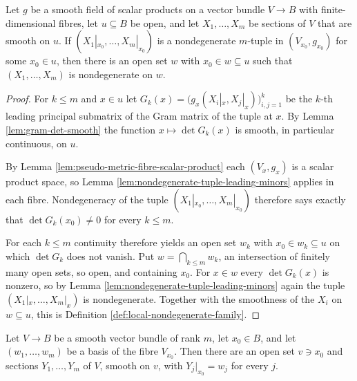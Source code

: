 \begin{lemma}
\label{lem:open-nondegenerate-tuple}
\leanok
{}
Let $g$ be a smooth field of scalar products on a vector bundle $V \to B$ with finite-dimensional fibres, let $u \subseteq B$ be open, and let $X_1,\ldots,X_m$ be sections of $V$ that are smooth on $u$. If $(X_1|_{x_0},\ldots,X_m|_{x_0})$ is a nondegenerate $m$-tuple in $(V_{x_0}, g_{x_0})$ for some $x_0 \in u$, then there is an open set $w$ with $x_0 \in w \subseteq u$ such that $(X_1,\ldots,X_m)$ is nondegenerate on $w$.
\end{lemma}

\begin{proof}
\leanok
{}
For $k \leq m$ and $x \in u$ let $G_k(x) = \bigl(g_x(X_i|_x, X_j|_x)\bigr)_{i,j=1}^{k}$ be the $k$-th leading principal submatrix of the Gram matrix of the tuple at $x$. By Lemma \ref{lem:gram-det-smooth} the function $x \mapsto \det G_k(x)$ is smooth, in particular continuous, on $u$.

By Lemma \ref{lem:pseudo-metric-fibre-scalar-product} each $(V_x, g_x)$ is a scalar product space, so Lemma \ref{lem:nondegenerate-tuple-leading-minors} applies in each fibre. Nondegeneracy of the tuple $(X_1|_{x_0},\ldots,X_m|_{x_0})$ therefore says exactly that $\det G_k(x_0) \neq 0$ for every $k \leq m$.

For each $k \leq m$ continuity therefore yields an open set $w_k$ with $x_0 \in w_k \subseteq u$ on which $\det G_k$ does not vanish. Put $w = \bigcap_{k \leq m} w_k$, an intersection of finitely many open sets, so open, and containing $x_0$. For $x \in w$ every $\det G_k(x)$ is nonzero, so by Lemma \ref{lem:nondegenerate-tuple-leading-minors} again the tuple $(X_1|_x,\ldots,X_m|_x)$ is nondegenerate. Together with the smoothness of the $X_i$ on $w \subseteq u$, this is Definition \ref{def:local-nondegenerate-family}.
\end{proof}

\begin{lemma}
\label{lem:sections-through-prescribed-basis}
\leanok
Let $V \to B$ be a smooth vector bundle of rank $m$, let $x_0 \in B$, and let $(w_1,\ldots,w_m)$ be a basis of the fibre $V_{x_0}$. Then there are an open set $v \ni x_0$ and sections $Y_1,\ldots,Y_m$ of $V$, smooth on $v$, with $Y_j|_{x_0} = w_j$ for every $j$.
\end{lemma}

